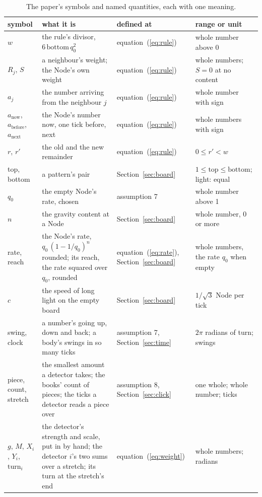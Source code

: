 \documentclass[pdflatex,sn-mathphys-num]{sn-jnl}
\begin{document}
\begin{table}[!t]\caption{\label{tab:symbols}The paper's symbols and named quantities, each with one meaning.}
\footnotesize\setlength{\tabcolsep}{1.5pt}\renewcommand{\arraystretch}{0.9}\begin{tabular}{>{\raggedright\arraybackslash}p{1.5cm}>{\raggedright\arraybackslash}p{6.4cm}>{\raggedright\arraybackslash}p{1.7cm}>{\raggedright\arraybackslash}p{3.0cm}}
\toprule
symbol & what it is & defined at & range or unit \\
\midrule
$w$ & the rule's divisor, $6\,\mathrm{bottom}\,q_0^2$ & equation~(\ref{eq:rule}) & whole number above 0 \\
$R_j$, $S$ & a neighbour's weight; the Node's own weight & equation~(\ref{eq:rule}) & whole numbers; $S = 0$ at no content \\
$a_j$ & the number arriving from the neighbour $j$ & equation~(\ref{eq:rule}) & whole number with sign \\
$a_{\mathrm{now}}$, $a_{\mathrm{before}}$, $a_{\mathrm{next}}$ & the Node's number now, one tick before, next & equation~(\ref{eq:rule}) & whole numbers with sign \\
$r$, $r'$ & the old and the new remainder & equation~(\ref{eq:rule}) & $0 \le r' < w$ \\
top, bottom & a pattern's pair & Section~\ref{sec:board} & $1 \le \mathrm{top} \le \mathrm{bottom}$; light: equal \\
$q_0$ & the empty Node's rate, chosen & assumption 7 & whole number above 1 \\
$n$ & the gravity content at a Node & Section~\ref{sec:board} & whole number, $0$ or more \\
rate, reach & the Node's rate, $q_0\,(1 - 1/q_0)^n$ rounded; its reach, the rate squared over $q_0$, rounded & equation~(\ref{eq:rate}), Section~\ref{sec:board} & whole numbers, the rate $q_0$ when empty \\
$c$ & the speed of long light on the empty board & Section~\ref{sec:board} & $1/\sqrt3$ Node per tick \\
swing, clock & a number's going up, down and back; a body's swings in so many ticks & assumption 7, Section~\ref{sec:time} & $2\pi$ radians of turn; swings \\
piece, count, stretch & the smallest amount a detector takes; the books' count of pieces; the ticks a detector reads a piece over & assumption 8, Section~\ref{sec:click} & one whole; whole number; ticks \\
$g$, $M$, $X_i$, $Y_i$, $\mathrm{turn}_i$ & the detector's strength and scale, put in by hand; the detector $i$'s two sums over a stretch; its turn at the stretch's end & equation~(\ref{eq:weight}) & whole numbers; radians \\

\end{tabular}
\end{table}
\end{document}
